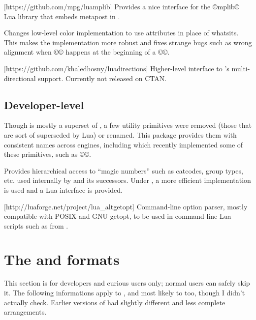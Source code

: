 \documentclass{lltxdoc}
\begin{document}
[https://github.com/mpg/luamplib]
Provides a nice interface for the ©mplib© Lua library that embeds metapost in
\luatex.

Changes low-level color implementation to use \luatex attributes in place of
whatsits. This makes the implementation more robust and fixes strange bugs
such as wrong alignment when ©\color© happens at the beginning of a ©\vbox©.

[https://github.com/khaledhosny/luadirections]
Higher-level interface to \luatex's multi-directional support. Currently not
released on CTAN.

\subsection{Developer-level}

Though \luatex is mostly a superset of \pdftex, a few utility primitives were
removed (those that are sort of superseded by Lua) or renamed. This package
provides them with consistent names across engines, including \xetex which
recently implemented some of these primitives, such as ©\strcmp©.

Provides hierarchical access to ``magic numbers'' such as catcodes, group
types, etc. used internally by \tex and its successors. Under \luatex, a more
efficient implementation is used and a Lua interface is provided.

[http://luaforge.net/project/lua_altgetopt]
Command-line option parser, mostly compatible with POSIX and GNU getopt, to be
used in command-line Lua scripts such as  from
.


\section{The  and  formats}\label{formats}

This section is for developers and curious users only; normal users can safely
skip it. The following informations apply to , and most likely to
 too, though I didn't actually check. Earlier versions of \texlive
had slightly different and less complete arrangements.
\end{document}
